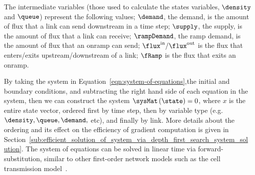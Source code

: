 
The intermediate variables (those used to calculate the states variables, $\density$ and $\queue$) represent the following values; $\demand$, the demand, is the amount of flux that a link can send downstream in a time step; $\supply$, the supply, is the amount of flux that a link can receive; $\rampDemand$, the ramp demand, is the amount of flux that an onramp can send; $\fIn/\fOut$ is the flux that enters/exits upstream/downstream of a link; $\fRamp$ is the flux that exits an onramp.

By taking the system in Equation~\eqref{eqn:system-of-equations},the initial and boundary conditions, and subtracting the right hand side of each equation in the system, then we can construct the system $\sysMat \left( \state \right) = 0$, where $x$ is the entire state vector, ordered first by time step, then by variable type (e.g. $\density, \queue, \demand,$ etc), and finally by link. More details about the ordering and its effect on the efficiency of gradient computation is given in Section~\ref{sub:efficient_solution_of_system_via_depth_first_search_system_solution}. The system of equations can be solved in linear time via forward-substitution, similar to other first-order network models such as the cell transmission model~\cite{daganzo1995cell}.






